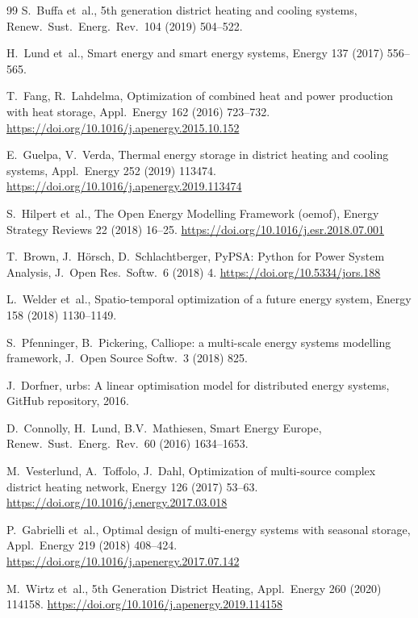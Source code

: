 \documentclass[review,3p]{elsarticle}
\begin{document}
\begin{thebibliography}{99}
S.~Buffa et~al.,
5th generation district heating and cooling systems,
Renew.\ Sust.\ Energ.\ Rev.\ 104 (2019) 504--522.

H.~Lund et~al.,
Smart energy and smart energy systems,
Energy 137 (2017) 556--565.

T.~Fang, R.~Lahdelma,
Optimization of combined heat and power production with heat storage,
Appl.\ Energy 162 (2016) 723--732.
\url{https://doi.org/10.1016/j.apenergy.2015.10.152}

E.~Guelpa, V.~Verda,
Thermal energy storage in district heating and cooling systems,
Appl.\ Energy 252 (2019) 113474.
\url{https://doi.org/10.1016/j.apenergy.2019.113474}

S.~Hilpert et~al.,
The Open Energy Modelling Framework (oemof),
Energy Strategy Reviews 22 (2018) 16--25.
\url{https://doi.org/10.1016/j.esr.2018.07.001}

T.~Brown, J.~H\"{o}rsch, D.~Schlachtberger,
PyPSA: Python for Power System Analysis,
J.\ Open Res.\ Softw.\ 6 (2018) 4.
\url{https://doi.org/10.5334/jors.188}

L.~Welder et~al.,
Spatio-temporal optimization of a future energy system,
Energy 158 (2018) 1130--1149.

S.~Pfenninger, B.~Pickering,
Calliope: a multi-scale energy systems modelling framework,
J.\ Open Source Softw.\ 3 (2018) 825.

J.~Dorfner,
urbs: A linear optimisation model for distributed energy systems,
GitHub repository, 2016.

D.~Connolly, H.~Lund, B.V.~Mathiesen,
Smart Energy Europe,
Renew.\ Sust.\ Energ.\ Rev.\ 60 (2016) 1634--1653.

M.~Vesterlund, A.~Toffolo, J.~Dahl,
Optimization of multi-source complex district heating network,
Energy 126 (2017) 53--63.
\url{https://doi.org/10.1016/j.energy.2017.03.018}

P.~Gabrielli et~al.,
Optimal design of multi-energy systems with seasonal storage,
Appl.\ Energy 219 (2018) 408--424.
\url{https://doi.org/10.1016/j.apenergy.2017.07.142}

M.~Wirtz et~al.,
5th Generation District Heating,
Appl.\ Energy 260 (2020) 114158.
\url{https://doi.org/10.1016/j.apenergy.2019.114158}


\end{thebibliography}
\end{document}
